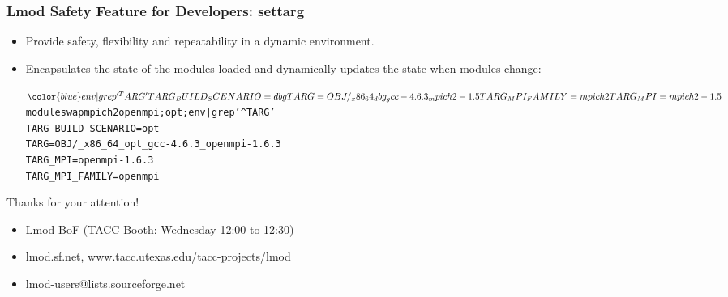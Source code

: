 \documentclass{beamer}
\begin{document}
\begin{frame}[fragile]
    \frametitle {Lmod Safety Feature for Developers: settarg}
    \begin{itemize}
      \item Provide safety, flexibility and repeatability in a dynamic environment.
      \item Encapsulates the state of the modules loaded and
        dynamically updates the state when modules change:
        {\tiny
          \begin{alltt}
              $ {\color{blue} env | grep '^TARG'}
              TARG_BUILD_SCENARIO=dbg
              TARG=OBJ/_x86_64_dbg_gcc-4.6.3_mpich2-1.5
              TARG_MPI_FAMILY=mpich2
              TARG_MPI=mpich2-1.5
              $ {\color{blue} module swap mpich2 openmpi; opt; env | grep '^TARG'}
              TARG_BUILD_SCENARIO=opt
              TARG=OBJ/_x86_64_opt_gcc-4.6.3_openmpi-1.6.3
              TARG_MPI=openmpi-1.6.3
              TARG_MPI_FAMILY=openmpi
          \end{alltt}
          }
      \end{itemize}
\end{frame}
  
\begin{frame}{Thanks for your attention!}
  \begin{itemize}
    \item Lmod BoF (TACC Booth:  Wednesday 12:00 to 12:30)
    \item lmod.sf.net, www.tacc.utexas.edu/tacc-projects/lmod
    \item lmod-users@lists.sourceforge.net
  \end{itemize}
\end{frame}
\end{document}
